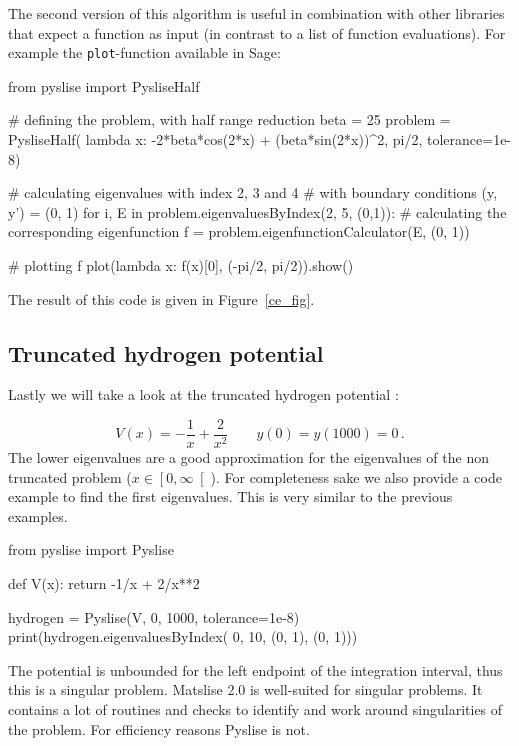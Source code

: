 The second version of this algorithm is useful in combination with other libraries that expect a function as input (in contrast to a list of function evaluations). For example the \texttt{plot}-function available in Sage:
\begin{python}
  from pyslise import PysliseHalf

  # defining the problem, with half range reduction
  beta = 25
  problem = PysliseHalf(
      lambda x: -2*beta*cos(2*x) + (beta*sin(2*x))^2,
      pi/2, tolerance=1e-8)
  
  # calculating eigenvalues with index 2, 3 and 4
  # with boundary conditions (y, y') = (0, 1)
  for i, E in problem.eigenvaluesByIndex(2, 5, (0,1)):
      # calculating the corresponding eigenfunction
      f = problem.eigenfunctionCalculator(E, (0, 1))
  
      # plotting f
      plot(lambda x: f(x)[0], (-pi/2, pi/2)).show()
\end{python}

The result of this code is given in Figure~\ref{ce_fig}.


\subsection{Truncated hydrogen potential}

Lastly we will take a look at the truncated hydrogen potential \cite{pryce_sltstpak_1999}:

\begin{equation}
  V(x) = -\frac{1}{x} + \frac{2}{x^2}  \qquad y(0)=y(1000)=0 \,. \label{thp}
\end{equation}
The lower eigenvalues are a good approximation for the eigenvalues of the non truncated problem ($x \in \left[0, \infty\right[$). For completeness sake we also provide a code example to find the first eigenvalues. This is very similar to the previous examples.

\begin{python}
  from pyslise import Pyslise

  def V(x):
    return -1/x + 2/x**2

  hydrogen = Pyslise(V, 0, 1000, tolerance=1e-8)
  print(hydrogen.eigenvaluesByIndex(
                      0, 10, (0, 1), (0, 1)))
\end{python}

The potential is unbounded for the left endpoint of the integration interval, thus this is a singular problem. Matslise 2.0 is well-suited for singular problems. It contains a lot of routines and checks to identify and work around singularities of the problem. For efficiency reasons Pyslise is not.

